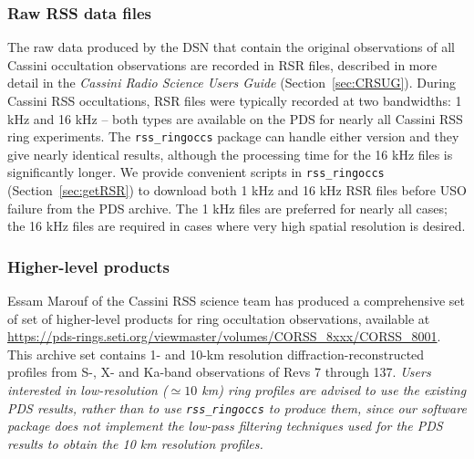 \documentclass[titlepage, 12pt]{article}
\begin{document}
            \subsubsection{Raw RSS data files}
                \label{sec:rawRSSfiles}
                The raw data  produced by the DSN that contain
                the original observations of all Cassini
                occultation observations are recorded in
                RSR files, described in more detail in the
                \textit{Cassini Radio Science Users Guide}
                (Section~\ref{sec:CRSUG}).
                During Cassini RSS occultations,
                RSR files were typically recorded at two
                bandwidths: 1 kHz and 16 kHz -- both types are available on the PDS for nearly all Cassini RSS ring experiments.
                The \texttt{rss\_ringoccs}
                package can handle either version
                and they give nearly identical results,
                although the processing time for the
                16 kHz files is significantly longer.
                We provide convenient scripts in
                \texttt{rss\_ringoccs}
                (Section~\ref{sec:getRSR})
                to download both 1 kHz and 16 kHz RSR files before USO failure
                from the PDS archive. The 1 kHz files are preferred for nearly all
                cases; the 16 kHz files are required in cases where very high spatial
                resolution is desired.
            \subsubsection{Higher-level products}
                Essam Marouf of the Cassini RSS science
                team has produced a comprehensive set of
                set of higher-level products for
                ring occultation observations, available at
                \url{https://pds-rings.seti.org/viewmaster/volumes/CORSS_8xxx/CORSS_8001}.
                This archive set contains 1- and 10-km resolution
                diffraction-reconstructed profiles
                from S-, X- and Ka-band observations
                of Revs 7 through 137. \textit{Users interested in low-resolution ($\simeq 10$ km)
                ring profiles are advised to use the existing PDS results, rather than to use \texttt{rss\_ringoccs} to produce them, since our software package does not implement the low-pass filtering techniques used for the PDS results to obtain the 10 km resolution profiles.}
                 \par\hfill\par
\end{document}
